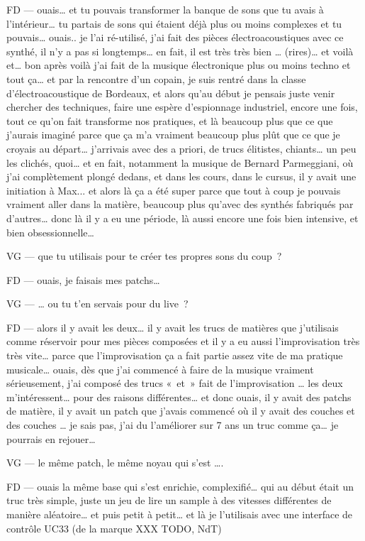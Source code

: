 FD —  ouais… et tu pouvais transformer la banque de sons que tu avais à l'intérieur… tu partais de sons qui étaient déjà plus ou moins complexes et tu pouvais… ouais.. je l'ai ré-utilisé, j'ai fait des pièces électroacoustiques avec ce synthé, il n'y a pas si longtemps… en fait, il est très très bien … (rires)… et voilà et… bon après voilà j'ai fait de la musique électronique plus ou moins techno et tout ça… et par la rencontre d'un copain, je suis rentré dans la classe d'électroacoustique de Bordeaux, et alors qu'au début je pensais juste venir chercher des techniques, faire une espère d'espionnage industriel, encore une fois, tout ce qu'on fait transforme nos pratiques, et là beaucoup plus que ce que j'aurais imaginé parce que ça m'a vraiment beaucoup plus plût que ce que je croyais au départ… j'arrivais avec des a priori, de trucs élitistes, chiants… un peu les clichés, quoi… et en fait, notamment la musique de Bernard Parmeggiani, où j'ai complètement plongé dedans, et dans les cours, dans le cursus, il y avait une initiation à Max... et alors là ça a été super parce que tout à coup je pouvais vraiment aller dans la matière, beaucoup plus qu'avec des synthés fabriqués par d'autres… donc là il y a eu une période, là aussi encore une fois bien intensive, et  bien obsessionnelle… 

VG —  que tu utilisais pour te créer tes propres sons du coup ? 

FD —  ouais, je faisais mes patchs… 

VG —  … ou tu t'en servais pour du live ?  

FD —  alors il y avait les deux… il y avait les trucs de matières que j'utilisais comme réservoir pour mes pièces composées et il y a eu aussi l'improvisation très très vite… parce que l'improvisation ça a fait partie assez vite de ma pratique musicale… ouais, dès que j'ai commencé à faire de la musique vraiment sérieusement, j'ai composé des trucs « et » fait de l'improvisation … les deux m'intéressent… pour des raisons différentes… et donc ouais, il y avait des patchs de matière, il y avait un patch que j'avais commencé où il y avait des couches et des couches … je sais pas, j'ai du l'améliorer sur 7 ans un truc comme ça… je pourrais en rejouer… 

VG —  le même patch, le même noyau qui s'est …. 

FD —  ouais la même base qui s'est enrichie, complexifié… qui au début était un truc très simple, juste un jeu de lire un sample à des vitesses différentes de manière aléatoire… et puis petit à petit… et là je l'utilisais avec une interface de contrôle UC33 (de la marque XXX TODO, NdT)  

